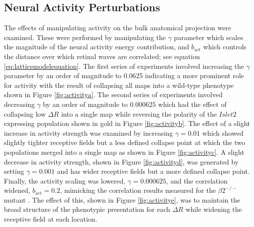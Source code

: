 \subsection{Neural Activity Perturbations}
The effects of manipulating activity on the bulk anatomical projection were examined. These were performed by manipulating the $\gamma$ parameter which scales the magnitude of the neural activity energy contribution, and $b_\text{act}$ which controls the distance over which retinal waves are correlated; see equation \ref{eq:latticemodelequation}. The first series of experiments involved increasing the $\gamma$ parameter by an order of magnitude to 0.0625 indicating a more prominent role for activity with the result of collapsing all maps into a wild-type phenotype shown in Figure \ref{fig:activitya}. The second series of experiments involved decreasing $\gamma$ by an order of magnitude to $0.000625$ which had the effect of collapsing low $\Delta R$ into a single map while reversing the polarity of the $Islet2$ expressing population shown in gold in Figure \ref{fig:activityb}. The effect of a slight increase in activity strength was examined by increasing $\gamma = 0.01$ which showed slightly tighter receptive fields but a less defined collapse point at which the two populations merged into a single map as shown in Figure \ref{fig:activityc}. A slight decrease in activity strength, shown in Figure \ref{fig:activityd}, was generated by setting $\gamma = 0.001$ and has wider receptive fields but a more defined collapse point. Finally, the activity scaling was lowered, $\gamma = 0.000625$,  and the correlation widened, $b_\text{act} = 0.2$,  mimicking the correlation results measured for the $\beta2^{-/-}$ mutant \cite{Stafford2009}. The effect of this, shown in Figure \ref{fig:activitye}, was to maintain the broad structure of the phenotypic presentation for each $\Delta R$ while widening the receptive field at each location.
\FloatBarrier
